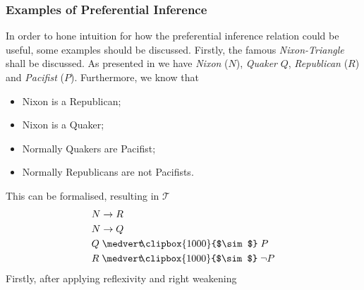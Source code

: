 \documentclass{article}
\newcommand*{\skepcon}{\ensuremath{\mathrel{\medvert\mskip-5.7mu\clipbox{1 0 0 0}{$\sim$}}}}
\begin{document}
\begin{comment}
Firstly, it has to be established that system \textbf{P} is more expressive than \textbf{C}. This can be done by recalling the Tweety-Problem ($\skepcon$ is used to introduce the notion of normality, e.g. a plausible consequence of $x$ being a bird is that it flies.)

\begin{equation*}
\begin{split}
&P(t) \\
&P(x) \skepcon B(x) \\
&B(x) \skepcon F(x) \\
&P(x) \skepcon \neg F(x)\\
\end{split}
\end{equation*}

in order to test whether the statement 

\begin{equation*}
\begin{split}
B(t) \wedge P(t) \skepcon \neg F(t)
\end{split}
\end{equation*}
can be inferred.

Following this, the sets of all possible inferences, i.e. the set of statements closed under the rules of the respective inference relation, can be computed.
!!!!!!!!!!!!!!!\\
Hence, we can observe that this statement can be expressed in \textbf{P}, but not in \textbf{C}. Thus we obtain that \textbf{P} is more expressive than \textbf{c}\\
Moreover, it has 
\end{comment}


\subsubsection*{Examples of Preferential Inference}
In order to hone intuition for how the preferential inference relation could be useful, some examples should be discussed. Firstly, the famous \emph{Nixon-Triangle} shall be discussed. As presented in \cite{nonmonoton_stanford2018} we have \emph{Nixon} ($N$), \emph{Quaker} $Q$, \emph{Republican} ($R$) and \emph{Pacifist} ($P$). Furthermore, we know that
\begin{itemize}
\item Nixon is a Republican;
\item Nixon is a Quaker;
\item Normally Quakers are Pacifist;
\item Normally Republicans are not Pacifists.
\end{itemize} 
This can be formalised, resulting in $\mathcal{T}$ 
\begin{equation*}
\begin{split}
&N \to R \\
&N \to Q \\
&Q \skepcon P \\
&R \skepcon \neg P \\
\end{split}
\end{equation*}
Firstly, after applying reflexivity and right weakening  
\end{document}

